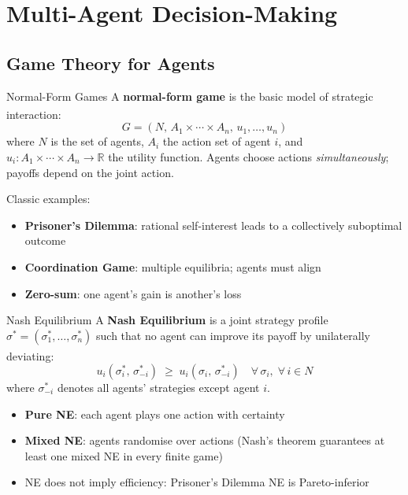 \section{Multi-Agent Decision-Making}

\subsection{Game Theory for Agents}

\begin{v3topic}{Normal-Form Games}
    A \textbf{normal-form game} is the basic model of strategic interaction:
    \textsuperscript{\cite[][Ch.~3]{shohamMultiagentSystemsAlgorithmic2009}}
    \[
        G = (N,\, A_1 \times \cdots \times A_n,\, u_1, \ldots, u_n)
    \]
    where $N$ is the set of agents, $A_i$ the action set of agent $i$, and
    $u_i: A_1 \times \cdots \times A_n \to \mathbb{R}$ the utility function.
    Agents choose actions \emph{simultaneously}; payoffs depend on the joint action.

    Classic examples:
    \begin{itemize}
        \item \textbf{Prisoner's Dilemma}: rational self-interest leads to a
              collectively suboptimal outcome
        \item \textbf{Coordination Game}: multiple equilibria; agents must align
        \item \textbf{Zero-sum}: one agent's gain is another's loss
    \end{itemize}

\end{v3topic}
\begin{v3topic}{Nash Equilibrium}
    A \textbf{Nash Equilibrium} is a joint strategy profile $\sigma^* =
    (\sigma_1^*, \ldots, \sigma_n^*)$ such that no agent can improve its payoff
    by unilaterally deviating:\textsuperscript{\cite[][p.~67]{shohamMultiagentSystemsAlgorithmic2009}}
    \begin{equation}
        u_i(\sigma_i^*,\, \sigma_{-i}^*) \;\geq\; u_i(\sigma_i,\, \sigma_{-i}^*)
        \quad \forall\, \sigma_i,\; \forall\, i \in N
    \end{equation}
    where $\sigma_{-i}^*$ denotes all agents' strategies except agent $i$.
    \begin{itemize}
        \item \textbf{Pure NE}: each agent plays one action with certainty
        \item \textbf{Mixed NE}: agents randomise over actions (Nash's theorem guarantees
              at least one mixed NE in every finite game)
        \item NE does not imply efficiency: Prisoner's Dilemma NE is Pareto-inferior
    \end{itemize}

\end{v3topic}
